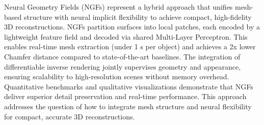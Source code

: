 Neural Geometry Fields (NGFs) represent a hybrid approach that unifies mesh-based structure with neural implicit flexibility to achieve compact, high-fidelity 3D reconstructions.  
NGFs partition surfaces into local patches, each encoded by a lightweight feature field and decoded via shared Multi-Layer Perceptron.  
This enables real-time mesh extraction (under 1 s per object) and achieves a 2x lower Chamfer distance compared to state-of-the-art baselines.  
The integration of differentiable inverse rendering jointly supervises geometry and appearance, ensuring scalability to high-resolution scenes without memory overhead.  
Quantitative benchmarks and qualitative visualizations demonstrate that NGFs deliver superior detail preservation and real-time performance.  
This approach addresses the question of how to integrate mesh structure and neural flexibility for compact, accurate 3D reconstructions.  

